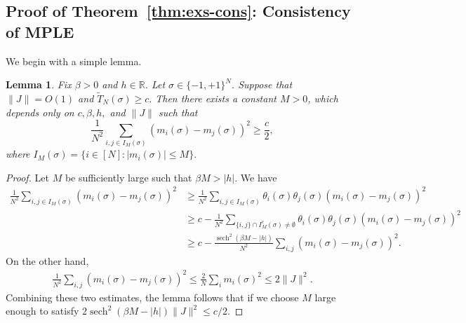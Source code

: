 \documentclass[letterpaper,11pt,reqno]{amsart}
\newtheorem{lem}[thm]{Lemma}
\renewcommand{\le}{\leqslant}
\renewcommand{\ge}{\geqslant}
\renewcommand{\leq}{\leqslant}
\newcommand{\mvgs}{{\sigma}}
\DeclareMathOperator{\sech}{sech}
\begin{document}
\subsection{Proof of Theorem~\ref{thm:exs-cons}: Consistency of MPLE}\label{sec2.3}

We begin with a simple lemma.

\begin{lem} \label{lem:T_n_restricted_lb}
    Fix $\beta > 0$ and $h \in \mathbb{R}$. Let $\mvgs \in \{-1, +1\}^N$.
    Suppose that $\| J \|  = O(1)$ and 
    $\widetilde T_N(\mvgs) \ge c.$ Then there exists a constant $M>0$, which depends only on $c, \beta, h,$ and $\|J\|$ such that 
    \[ \frac{1}{N^2} \sum_{ i, j \in I_M(\mvgs)} (m_i(\mvgs) - m_j(\mvgs))^2  \ge \frac{c}{2}, \]
    where $I_M(\mvgs)=\{i\in [N]:|m_i(\mvgs)|\leq M\}.$
\end{lem}

\begin{proof}
    Let $M$ be sufficiently large such that $\beta M > |h|$. We have 
    \begin{align*}
      \frac{1}{N^2} \sum_{ i, j \in I_M(\mvgs)} (m_i(\mvgs) - m_j(\mvgs))^2  &\ge 
      \frac{1}{N^2} \sum_{ i, j \in I_M(\mvgs)} \theta_i(\mvgs) \theta_j(\mvgs) (m_i(\mvgs) - m_j(\mvgs))^2 \\
      &\ge c - \frac{1}{N^2} \sum_{ \{i, j\} \cap I_M^c(\mvgs) \ne \emptyset} \theta_i(\mvgs) \theta_j(\mvgs) (m_i(\mvgs) - m_j(\mvgs))^2 \\
      &\ge c - 
      \frac{\sech^2(\beta M  - |h|)}{N^2} \sum_{ i, j}  (m_i(\mvgs) - m_j(\mvgs))^2.
    \end{align*}
    On the other hand, 
\begin{align*}
    \frac{1}{N^2} \sum_{ i, j}  (m_i(\mvgs) - m_j(\mvgs))^2 \le  \frac{2}{N} \sum_{ i}  m_i(\mvgs)^2 \le 2\|J\|^2.
\end{align*}    
Combining these two estimates, the lemma follows that if we choose $M$ large enough to satisfy
$2\sech^2(\beta M  - |h|)\|J\|^2 \le c/2 $.

\end{proof}
\end{document}
